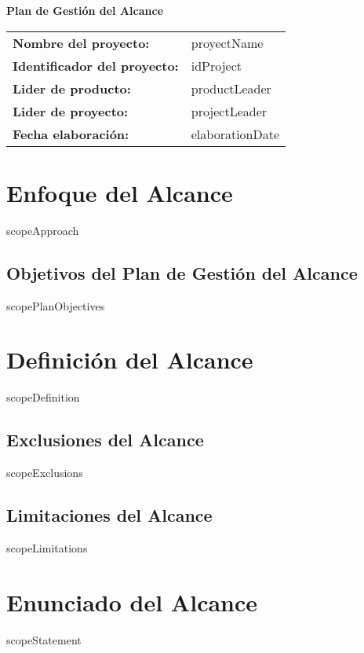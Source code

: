 \documentclass{article}
\begin{document}
\begin{center}
{\huge\textbf{Plan de Gestión del Alcance}}\\[14cm]
\end{center}

\newcommand{\wrappingmulticolumn}[3] 
    {\multicolumn{#1}
                 {|>{\hsize=\dimexpr#1\hsize+\tabcolsep * (2 * (#1 - 1) )+\arrayrulewidth* (#1 - 2)\relax}#2|}
                 {#3}}
\renewcommand{\arraystretch}{1.5} %

\begin{tabular}{|ll|} \hline
\rowcolor{gray!10}\textbf{Nombre del proyecto:} & {{proyectName}} \\[0.3cm]
\textbf{Identificador del proyecto:} & {{idProject}} \\[0.3cm]
\textbf{Lider de producto:} & {{productLeader}} \\[0.3cm]
\textbf{Lider de proyecto:} & {{projectLeader}} \\[0.3cm]
\textbf{Fecha elaboración:} & {{elaborationDate}} \\ \hline
\end{tabular}

\newpage

\tableofcontents
\newpage

\section{Enfoque del Alcance}
{{scopeApproach}}
\subsection{Objetivos del Plan de Gestión del Alcance}
{{scopePlanObjectives}}

\section{Definición del Alcance}
{{scopeDefinition}}
\subsection{Exclusiones del Alcance}
{{scopeExclusions}}
\subsection{Limitaciones del Alcance}
{{scopeLimitations}}

\section{Enunciado del Alcance}
{{scopeStatement}}
\end{document}
